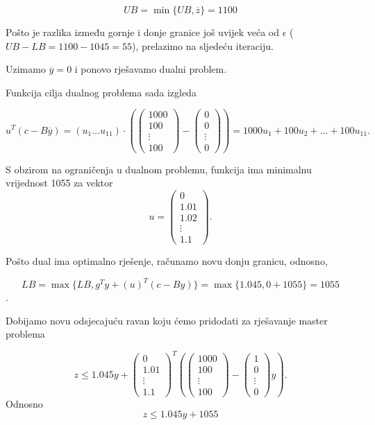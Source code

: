 \documentclass[a4paper, utf8, 11pt, colorlinks]{book}
\theoremstyle{definition}
\begin{document}
$$UB = \min\{UB,\overline{z}\} = 1100$$

Pošto je razlika između gornje i donje granice još uvijek veća od $\epsilon$ ($UB-LB = 1100-1045=55$), prelazimo na sljedeću iteraciju.

Uzimamo $\overline{y}=0$ i ponovo rješavamo dualni problem.

Funkcija cilja dualnog problema sada izgleda 

 $$
u^T (c-B\overline{y})=(u_1\ldots u_{11})\cdot \left(\left(\begin{array}{c}
	1000 \\
	100 \\
	\vdots \\
	100
\end{array}\right)-\left(\begin{array}{c}
	0 \\
	0 \\
	\vdots \\
	0
\end{array}\right)\right) =1000u_1+ 100u_2+\ldots+100u_{11}.
$$

S obzirom na ograničenja u dualnom problemu, funkcija ima minimalnu vrijednost 1055 za vektor $$u=\left(\begin{array}{c}
	0\\
	1.01 \\
	1.02 \\
	\vdots \\
	1.1
\end{array}\right).$$

Pošto dual ima optimalno rješenje, računamo novu donju granicu, odnosno,


$$LB = \max\{LB,g^Ty+(u)^T(c-By)\}=\max\{1.045,0+ 1055\} = 1055$$.

Dobijamo novu odsjecajuću ravan koju ćemo pridodati za rješavanje master problema

$$z\leqslant 1.045y+\left(\begin{array}{c}
	0\\
	1.01 \\
	\vdots \\
	1.1
\end{array}\right)^T
\left(\left(\begin{array}{c}
	1000 \\
	100 \\
	\vdots \\
	100
\end{array}\right)-\left(\begin{array}{c}
	1 \\
	0 \\
	\vdots \\
	0
\end{array}\right)y\right).$$
Odnosno 
$$z\leqslant 1.045y+1055$$
\end{document}
